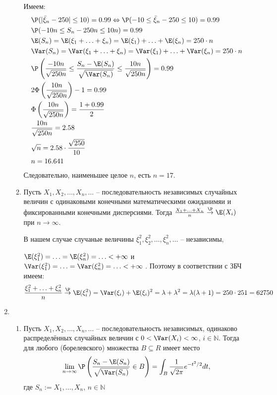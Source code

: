 \begin{enumerate}
\begin{enumerate}
Имеем:
\begin{align*}
&\P(\vert\bar{\xi}_n - 250\vert \leq 10) = 0.99 \Leftrightarrow \P(-10\leq \bar{\xi}_n - 250 \leq 10) = 0.99 \\
&\P(-10n \leq S_n - 250n \leq 10n) = 0.99 \\
&\E(S_n) = \E(\xi_1 + \ldots + \xi_n) = \E(\xi_1) + \ldots + \E(\xi_n) = 250 \cdot n\\
&\Var(S_n) = \Var(\xi_1 + \ldots + \xi_n) = \Var(\xi_1) + \ldots + \Var(\xi_n) = 250 \cdot n \\
&\P\left(\frac{-10n}{\sqrt{250n}} \leq \frac{S_n - \E (S_n)}{\sqrt{\Var(S_n)}} \leq \frac{10n}{\sqrt{250n}}\right) = 0.99  \\
&2 \Phi \left(\frac{10n}{\sqrt{250n}}\right) -1 = 0.99 \\
&\Phi \left(\frac{10n}{\sqrt{250n}}\right) = \frac{1 + 0.99}{2}  \\
&\frac{10n}{\sqrt{250n}} = 2.58 \\
&\sqrt{n} = 2.58 \cdot \frac{\sqrt{250}}{10}  \\
&n = 16.641
\end{align*}
Следовательно, наименьшее целое $n$, есть $n=17$.
\item Пусть $X_1, X_2, \ldots, X_n, \ldots$ – последовательность независимых случайных величин с одинаковыми конечными математическими ожиданимяи и фиксированными конечными дисперсиями. Тогда $\frac{X_1 + \ldots + X_n}{n} \stackrel{\P}{\to} \E(X_i)$ при $n \to \infty$.

В нашем случае случаные величины $\xi_1^2, \xi_2^2, \ldots, \xi_n^2, \ldots$ – независимы,

$\E(\xi_1^2) = \ldots = \E(\xi_n^2) = \ldots < + \infty$ и $\Var(\xi_1^2) = \ldots = \Var(\xi_n^2) = \ldots < + \infty$ . Поэтому в соответствии с ЗБЧ имеем:
\[
\frac{\xi_1^2 +\ldots+ \xi_n^2}{n} \stackrel{\P}{\to} \E(\xi_i^2) = \Var(\xi_i) +\E(\xi_i)^2 = \lambda + \lambda^2 = \lambda(\lambda+1) = 250\cdot251 = 62750
\]
\end{enumerate}

\item \begin{enumerate}
\item Пусть $X_1, X_2, \ldots, X_n, \ldots$ – последовательность независимых,
одинаково распределённых случайных величин с $0<\Var(X_i)<\infty$, $i \in \mathbb{N}$.
Тогда для любого (борелевского) множества $B \subseteq R$ имеет место
\[
\lim_{n \to \infty} \P\left(\frac{S_n - \E(S_n)}{\sqrt{\Var(S_n)}} \in B\right) = \int_B \frac{1}{\sqrt{2\pi}}e^{-t^2/2} dt,
\]
где $S_n := X_1, \ldots, X_n$, $n \in \mathbb{N}$


\end{enumerate}
\end{enumerate}
